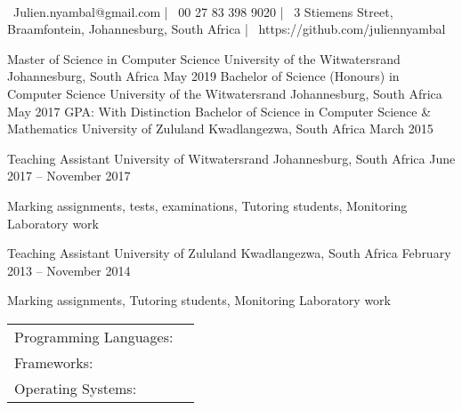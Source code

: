 \documentclass[]{awesome-cv}
\begin{document}
\begin{center}
	  \\
	\vspace{2mm}
	{\faEnvelope\ Julien.nyambal@gmail.com} | {\faMobile\ 00 27 83 398 9020} | {\faMapMarker\ 3 Stiemens Street, Braamfontein, Johannesburg, South Africa} | {\faLink\ https://github.com/juliennyambal}
\end{center}
\begin{cventries}
	\cventry
	{Master of Science in Computer Science}
	{University of the Witwatersrand}
	{Johannesburg, South Africa}
	{May 2019}
	{}
	\cventry
	{Bachelor of Science (Honours) in Computer Science}
	{University of the Witwatersrand}
	{Johannesburg, South Africa}
	{May 2017}
	{GPA: With Distinction}
	\cventry
	{Bachelor of Science in Computer Science \& Mathematics}
	{University of Zululand}
	{Kwadlangezwa, South Africa}
	{March 2015}
	{}
\end{cventries}

\vspace{-2mm}
\begin{cventries}
	\cventry
	{Teaching Assistant}
	{University of Witwatersrand}
	{Johannesburg, South Africa}
	{June 2017 – November 2017}
	{\begin{cvitems}
		\item {Marking assignments, tests, examinations, Tutoring students, Monitoring Laboratory work}
		\end{cvitems}}
	\cventry
	{Teaching Assistant}
	{University of Zululand}
	{Kwadlangezwa, South Africa}
	{February 2013 – November 2014}
	{\begin{cvitems}
		\item {Marking assignments, Tutoring students, Monitoring Laboratory work}
		\end{cvitems}}
\end{cventries}
\begin{cventries}
	\cventry
	{}
	{\def\arraystretch{1.15}{\begin{tabular}{ l l }
		Programming Languages:  & {\skill{ Python(fluent), Octave/Matlab, Java, Scala(basic), C++(basic), SQL, LateX, Shell (Bash)}} \\
		Frameworks:  & {\skill{ Caffe, Keras (Tensorflow), Nvidia DiGITS, Spyder, Git, Android Studio, Scikit-learn, PBS (Cluster Computing).}} \\
		Operating Systems:  & {\skill{ Ubuntu Linux (Prefered), Windows, MacOS(basic)}} \\
		\end{tabular}}}
	{}
	{}
	{}
\end{cventries}
\end{document}
